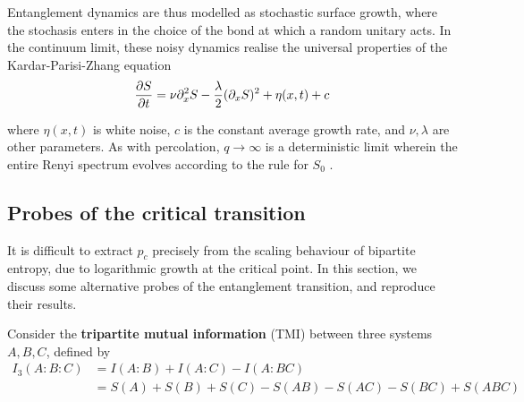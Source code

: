 \documentclass[10pt]{article}
\begin{document}
Entanglement dynamics are thus modelled as stochastic surface growth, where the stochasis enters in the choice of the bond at which a random unitary acts. In the continuum limit, these noisy dynamics realise the universal properties of the Kardar-Parisi-Zhang equation
\begin{equation}
\pdv{S}{t} = \nu \partial_x^2 S - \frac{\lambda}{2} (\partial_x S)^2 + \eta(x,t) + c
\end{equation}

where $\eta(x,t)$ is white noise, $c$ is the constant average growth rate, and $\nu,\lambda$ are other parameters. As with percolation, $q \rightarrow \infty$ is a deterministic limit wherein the entire Renyi spectrum evolves according to the rule for $S_0$ \cite{nahum2017quantum}.






\subsection{Probes of the critical transition}

It is difficult to extract $p_c$ precisely from the scaling behaviour of bipartite entropy, due to logarithmic growth at the critical point. In this section, we discuss some alternative probes of the entanglement transition, and reproduce their results.

Consider the \textbf{tripartite mutual information} (TMI) between three systems $A,B,C$, defined by
\begin{align}
I_3(A:B:C) 
&= I(A:B) + I(A:C) - I(A:BC) \\
&= S(A) + S(B) + S(C) - S(AB) - S(AC) - S(BC) + S(ABC) 
\end{align}
\end{document}

